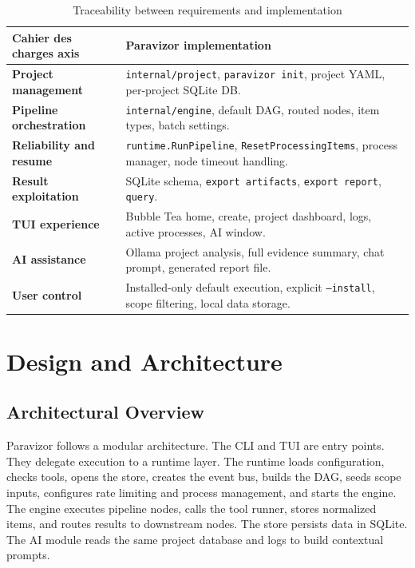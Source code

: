 \documentclass[a4paper,12pt]{article}
\begin{document}
\begin{table}[H]
    \centering
    \begin{tabularx}{\textwidth}{>{\bfseries}p{4cm}X}
        \toprule
        Cahier des charges axis & Paravizor implementation \\
        \midrule
        Project management & \texttt{internal/project}, \texttt{paravizor init}, project YAML, per-project SQLite DB. \\
        Pipeline orchestration & \texttt{internal/engine}, default DAG, routed nodes, item types, batch settings. \\
        Reliability and resume & \texttt{runtime.RunPipeline}, \texttt{ResetProcessingItems}, process manager, node timeout handling. \\
        Result exploitation & SQLite schema, \texttt{export artifacts}, \texttt{export report}, \texttt{query}. \\
        TUI experience & Bubble Tea home, create, project dashboard, logs, active processes, AI window. \\
        AI assistance & Ollama project analysis, full evidence summary, chat prompt, generated report file. \\
        User control & Installed-only default execution, explicit \texttt{--install}, scope filtering, local data storage. \\
        \bottomrule
    \end{tabularx}
    \caption{Traceability between requirements and implementation}
    \label{tab:traceability}
\end{table}

\newpage

\section{Design and Architecture}

\subsection{Architectural Overview}

Paravizor follows a modular architecture. The CLI and TUI are entry points. They delegate execution to a runtime layer. The runtime loads configuration, checks tools, opens the store, creates the event bus, builds the DAG, seeds scope inputs, configures rate limiting and process management, and starts the engine. The engine executes pipeline nodes, calls the tool runner, stores normalized items, and routes results to downstream nodes. The store persists data in SQLite. The AI module reads the same project database and logs to build contextual prompts.
\end{document}
